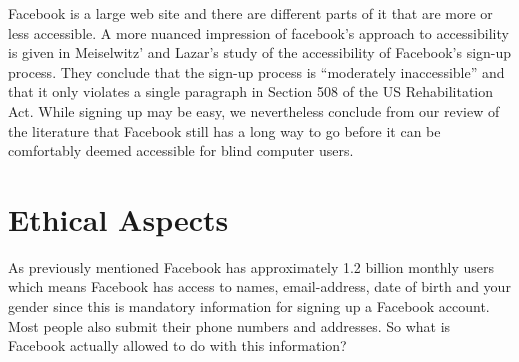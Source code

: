 \documentclass[conference]{IEEEtran}
\begin{document}
Facebook is a large web site and there are different parts of it that are more
or less accessible. A more nuanced impression of facebook's approach to
accessibility is given in Meiselwitz' and Lazar's \cite{meiselwitz2009} study
of the accessibility of Facebook's sign-up process. They conclude that the
sign-up process is ``moderately inaccessible'' and that it only violates a
single paragraph in Section 508 of the US Rehabilitation Act. While signing up
may be easy, we nevertheless conclude from our review of the literature that
Facebook still has a long way to go before it can be comfortably deemed
accessible for blind computer users.


% 
% 
% 
% 
% 
% 

\section{Ethical Aspects}
\label{ethics}
As previously mentioned Facebook has approximately  1.2 billion monthly users
which means Facebook has access to names, email-address, date of birth and your
gender since this is mandatory information for signing up a Facebook account.
Most people also submit their phone numbers and addresses. So what is Facebook
actually allowed to do with this information?
\end{document}
